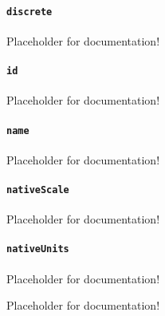 \paragraph{\texttt{discrete}}\mbox{}
\newline\tab Placeholder for documentation!

\paragraph{\texttt{id}}\mbox{}
\newline\tab Placeholder for documentation!

\paragraph{\texttt{name}}\mbox{}
\newline\tab Placeholder for documentation!

\paragraph{\texttt{nativeScale}}\mbox{}
\newline\tab Placeholder for documentation!

\paragraph{\texttt{nativeUnits}}\mbox{}
\newline\tab Placeholder for documentation!

Placeholder for documentation!

